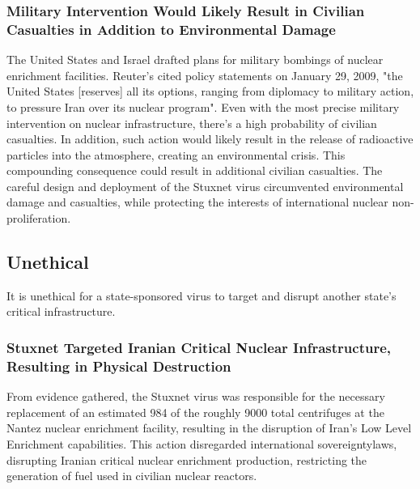 \documentclass[12pt]{article}
\begin{document}
\begin{multicols}{2}
\subsubsection{Military Intervention Would Likely Result in Civilian Casualties in Addition to Environmental Damage}

The United States and Israel drafted plans for military bombings of nuclear enrichment facilities. Reuter's cited policy statements on January 29, 2009, "the United States [reserves] all its options, ranging from diplomacy to military action, to pressure Iran over its nuclear program".\cite{usOptionsForIran} Even with the most precise military intervention on nuclear infrastructure, there's a high probability of civilian casualties. In addition, such action would likely result in the release of radioactive particles into the atmosphere, creating an environmental crisis. This compounding consequence could result in additional civilian casualties. The careful design and deployment of the Stuxnet virus circumvented environmental damage and casualties, while protecting the interests of international nuclear non-proliferation.

\subsection{Unethical}

It is unethical for a state-sponsored virus to target and disrupt another state's critical infrastructure.

\subsubsection{Stuxnet Targeted Iranian Critical Nuclear Infrastructure, Resulting in Physical Destruction}

From evidence gathered, the Stuxnet virus was responsible for the necessary replacement of an estimated 984 of the roughly 9000 total centrifuges at the Nantez nuclear enrichment facility, resulting in the disruption of Iran's Low Level Enrichment capabilities.\cite{lookIntoIranianNuclearProgram} This action disregarded international sovereignty\footnotemark[2]  laws, disrupting Iranian critical nuclear enrichment production, restricting the generation of fuel used in civilian nuclear reactors.\cite{internationalSovereigntyDefinition}



\end{multicols}
\end{document}
